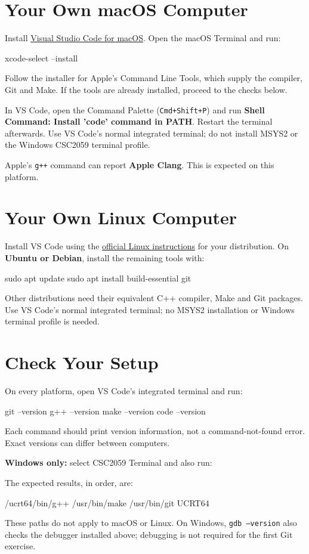 \documentclass{csc2059practical}
\begin{document}
\section{Your Own macOS Computer}
Install \href{https://code.visualstudio.com/docs/setup/mac}{Visual Studio Code for macOS}. Open the macOS Terminal and run:
\begin{bashcode}
xcode-select --install
\end{bashcode}
Follow the installer for Apple's Command Line Tools, which supply the compiler, Git and Make. If the tools are already installed, proceed to the checks below.

In VS Code, open the Command Palette (\texttt{Cmd+Shift+P}) and run \textbf{Shell Command: Install 'code' command in PATH}. Restart the terminal afterwards. Use VS Code's normal integrated terminal; do not install MSYS2 or the Windows CSC2059 terminal profile.

Apple's \texttt{g++} command can report \textbf{Apple Clang}. This is expected on this platform.

\section{Your Own Linux Computer}
Install VS Code using the \href{https://code.visualstudio.com/docs/setup/linux}{official Linux instructions} for your distribution. On \textbf{Ubuntu or Debian}, install the remaining tools with:
\begin{bashcode}
sudo apt update
sudo apt install build-essential git
\end{bashcode}
Other distributions need their equivalent C++ compiler, Make and Git packages. Use VS Code's normal integrated terminal; no MSYS2 installation or Windows terminal profile is needed.

\section{Check Your Setup}\label{sec:checks}
On every platform, open VS Code's integrated terminal and run:
\begin{bashcode}
git --version
g++ --version
make --version
code --version
\end{bashcode}
Each command should print version information, not a command-not-found error. Exact versions can differ between computers.

\textbf{Windows only:} select CSC2059 Terminal and also run:
The expected results, in order, are:
\begin{terminal}
/ucrt64/bin/g++
/usr/bin/make
/usr/bin/git
UCRT64
\end{terminal}
These paths do not apply to macOS or Linux. On Windows, \texttt{gdb --version} also checks the debugger installed above; debugging is not required for the first Git exercise.
\end{document}
